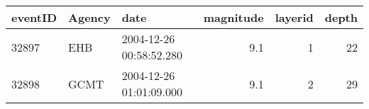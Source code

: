 \begin{tabular}{lllrrr}
\toprule
eventID & Agency &                    date &  magnitude &  layerid &  depth \\
\midrule
  32897 &    EHB & 2004-12-26 00:58:52.280 &        9.1 &        1 &     22 \\
  32898 &   GCMT & 2004-12-26 01:01:09.000 &        9.1 &        2 &     29 \\
\bottomrule
\end{tabular}
